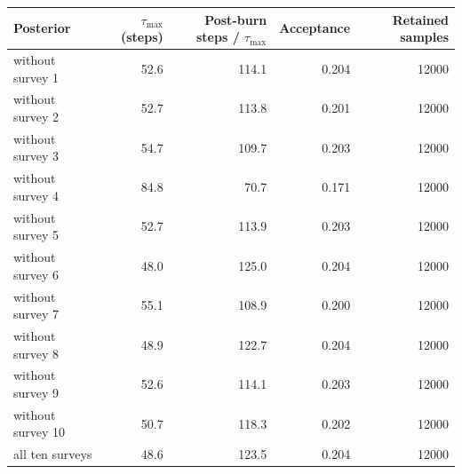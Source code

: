 \begin{tabular}{@{}lrrrr@{}}
\toprule
Posterior & $\tau_{\max}$ (steps) & Post-burn steps / $\tau_{\max}$ & Acceptance & Retained samples \\
\midrule
without survey 1 & 52.6 & 114.1 & 0.204 & 12000 \\
without survey 2 & 52.7 & 113.8 & 0.201 & 12000 \\
without survey 3 & 54.7 & 109.7 & 0.203 & 12000 \\
without survey 4 & 84.8 & 70.7 & 0.171 & 12000 \\
without survey 5 & 52.7 & 113.9 & 0.203 & 12000 \\
without survey 6 & 48.0 & 125.0 & 0.204 & 12000 \\
without survey 7 & 55.1 & 108.9 & 0.200 & 12000 \\
without survey 8 & 48.9 & 122.7 & 0.204 & 12000 \\
without survey 9 & 52.6 & 114.1 & 0.203 & 12000 \\
without survey 10 & 50.7 & 118.3 & 0.202 & 12000 \\
all ten surveys & 48.6 & 123.5 & 0.204 & 12000 \\
\bottomrule
\end{tabular}
